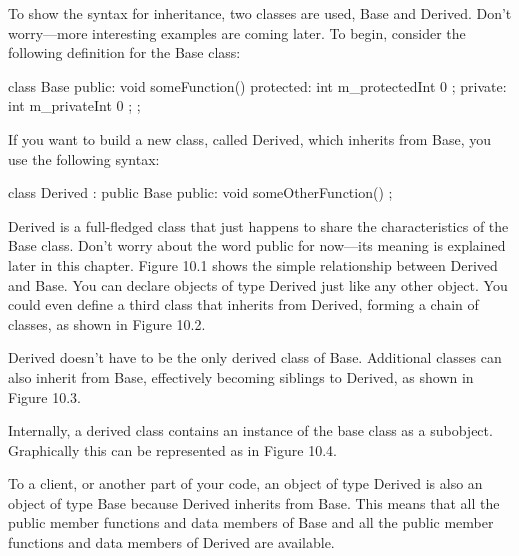 To show the syntax for inheritance, two classes are used, Base and Derived. Don’t worry—more interesting examples are coming later. To begin, consider the following definition for the Base class:

\begin{cpp}
class Base
{
    public:
        void someFunction() {}
    protected:
        int m_protectedInt { 0 };
    private:
        int m_privateInt { 0 };
};
\end{cpp}

If you want to build a new class, called Derived, which inherits from Base, you use the following syntax:

\begin{cpp}
class Derived : public Base
{
    public:
        void someOtherFunction() {}
};
\end{cpp}

Derived is a full-fledged class that just happens to share the characteristics of the Base class. Don’t worry about the word public for now—its meaning is explained later in this chapter. Figure 10.1 shows the simple relationship between Derived and Base. You can declare objects of type Derived just like any other object. You could even define a third class that inherits from Derived, forming a chain of classes, as shown in Figure 10.2.



Derived doesn’t have to be the only derived class of Base. Additional classes can also inherit from Base, effectively becoming siblings to Derived, as shown in Figure 10.3.


Internally, a derived class contains an instance of the base class as a subobject. Graphically this can be represented as in Figure 10.4.



To a client, or another part of your code, an object of type Derived is also an object of type Base because Derived inherits from Base. This means that all the public member functions and data members of Base and all the public member functions and data members of Derived are available.

